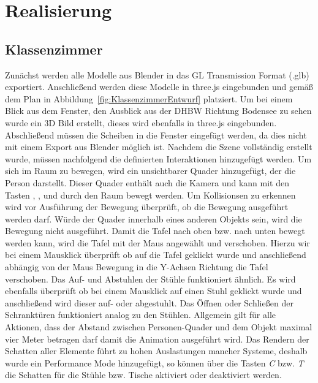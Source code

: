 \section{Realisierung}
\subsection{Klassenzimmer}
Zunächst werden alle Modelle aus Blender in das GL Transmission Format (.glb) exportiert.
Anschließend werden diese Modelle in three.js eingebunden und gemäß dem Plan in Abbildung~\ref{fig:KlassenzimmerEntwurf}
platziert.
Um bei einem Blick aus dem Fenster, den Ausblick aus der DHBW Richtung Bodensee zu sehen wurde ein 3D Bild erstellt,
dieses wird ebenfalls in three.js eingebunden.
Abschließend müssen die Scheiben in die Fenster eingefügt werden, da dies nicht mit einem Export aus Blender möglich ist.
\newparagraph
Nachdem die Szene vollständig erstellt wurde, müssen nachfolgend die definierten Interaktionen hinzugefügt werden.
Um sich im Raum zu bewegen, wird ein unsichtbarer Quader hinzugefügt, der die Person darstellt. Dieser Quader enthält auch die Kamera
und kann mit den Tasten , ,  und  durch den Raum bewegt werden. Um Kollisionsen zu erkennen wird vor Ausführung der Bewegung überprüft,
ob die Bewegung ausgeführt werden darf. 
Würde der Quader innerhalb eines anderen Objekts sein, wird die Bewegung nicht ausgeführt.
\newparagraph
Damit die Tafel nach oben bzw. nach unten bewegt werden kann, wird die Tafel mit der Maus angewählt und verschoben.
Hierzu wir bei einem Mausklick überprüft ob auf die Tafel geklickt wurde und anschließend abhängig von der Maus Bewegung in die Y-Achsen Richtung die Tafel verschoben.
Das Auf- und Abstuhlen der Stühle funktioniert ähnlich. Es wird ebenfalls überprüft ob bei einem Mausklick auf einen Stuhl geklickt wurde und anschließend wird dieser auf- oder abgestuhlt.
Das Öffnen oder Schließen der Schranktüren funktioniert analog zu den Stühlen.
Allgemein gilt für alle Aktionen, dass der Abstand zwischen Personen-Quader und dem Objekt maximal vier Meter betragen darf damit die Animation ausgeführt wird.
\newparagraph
Das Rendern der Schatten aller Elemente führt zu hohen Auslastungen mancher Systeme, deshalb wurde ein Performance Mode hinzugefügt, so können über die Tasten \textit{C} bzw. \textit{T}
die Schatten für die Stühle bzw. Tische aktiviert oder deaktiviert werden.
